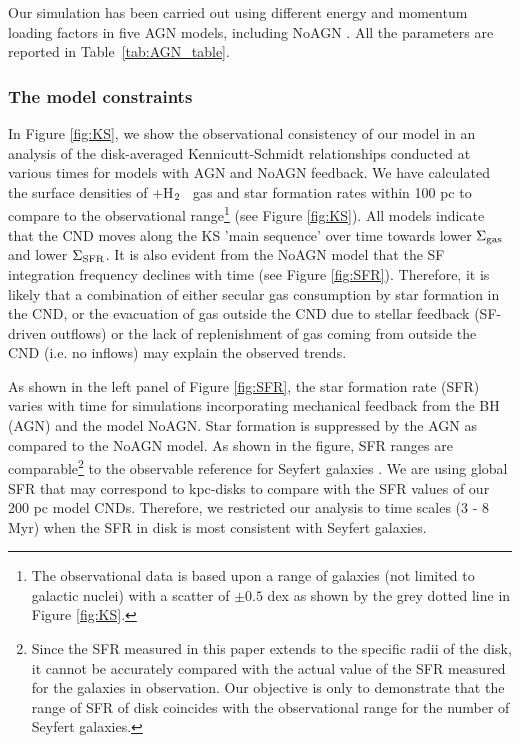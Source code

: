 \documentclass[fleqn,usenatbib]{mnras}
\newcommand{\HI}{\ion{H}{i}}
\newcommand{\HH}{\mbox{H$\rm _2$}}
\begin{document}
Our simulation has been carried out using different energy and momentum loading factors in five AGN models, including NoAGN \citep[with value for $\beta$ and $v_{\rm wind}$ in eqs. \ref{eq:momentum}, 3 based on observations and theoretical models; see for e.g.][]{Moe2009,Dunn2010,Hamann2011,Borguet2013}. All  the parameters are reported in Table~\ref{tab:AGN_table}. 


\subsubsection{The model constraints}
In Figure \ref{fig:KS}, we show the observational consistency of our model in an analysis of the disk-averaged Kennicutt-Schmidt \citep[KS;][]{Kennicutt1998} relationships conducted at various times for models with AGN and NoAGN feedback. We have calculated the surface densities of \HI+\HH~ gas and star formation rates within 100 pc to compare to the observational range\footnote{The observational data is based upon a range of galaxies (not limited to galactic nuclei) with a scatter of $\pm 0.5$ dex as shown by the grey dotted line \citep{Narayanan2012} in Figure \ref{fig:KS}.} (see Figure \ref{fig:KS}). All models indicate that the CND moves along the KS 'main sequence' over time towards lower $\Sigma_{\rm gas}$ and lower $\Sigma_{\rm SFR}$. It is also evident from the NoAGN model that the SF integration frequency declines with time (see Figure \ref{fig:SFR}). Therefore, it is likely that a combination of either secular gas consumption by star formation in the CND, or the evacuation of gas outside the CND due to stellar feedback (SF-driven outflows) or the lack of replenishment of gas coming from outside the CND (i.e. no inflows) may explain the observed trends.

As shown in the left panel of Figure \ref{fig:SFR}, the star formation rate (SFR) varies with time for simulations incorporating mechanical feedback from the BH (AGN) and the model NoAGN. Star formation is suppressed by the AGN as compared to the NoAGN model.   
As shown in the figure, SFR ranges are comparable\footnote{Since the SFR measured in this paper extends to the specific radii of the disk, it cannot be accurately compared with the actual value of the SFR measured for the galaxies in observation. Our objective is only to demonstrate that the range of SFR of disk coincides with the observational range for the number of Seyfert galaxies.} to the observable reference for Seyfert galaxies \citep[see Tab. 1][for details and reference of SFR values]{Combes2019}. We are using global SFR that may correspond to kpc-disks to compare with the SFR values of our 200 pc model CNDs. Therefore, we restricted our analysis to time scales (3 - 8 Myr) when the SFR in disk is most consistent with Seyfert galaxies. 
\end{document}
